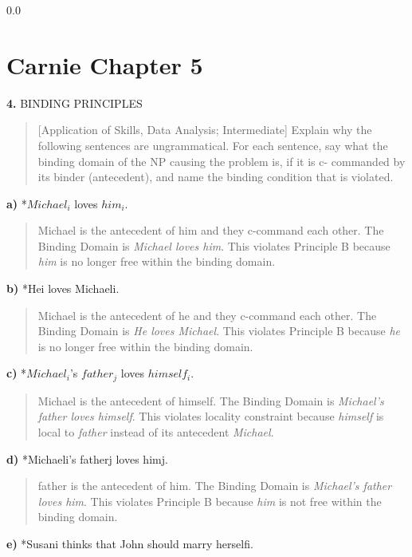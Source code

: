 \documentclass[11pt,notitlepage]{article}
\newcommand{\question}[2]{\textbf{#1.} #2}
\newcommand{\subquestion}[2]{\par\hspace{0.5cm} \textbf{#1)} #2}
\begin{document}
  {\setlength{\baselineskip}%
           {0.0\baselineskip}
  \section*{Carnie Chapter 5}
  \hrulefill \par}

\question{4}{BINDING PRINCIPLES}
\begin{quote}
[Application of Skills, Data Analysis; Intermediate]
Explain why the following sentences are ungrammatical. For each
sentence, say what the binding domain of the NP causing the problem
is, if it is c- commanded by its binder (antecedent), and name the
binding condition that is violated.
\end{quote}

\subquestion{a}{*$Michael_i$ loves $him_i$.}

\begin{quote}
  Michael is the antecedent of him and they c-command each other. The Binding Domain is
  \emph{Michael loves him}. This violates Principle B because
  \emph{him} is no longer free within the binding domain.
\end{quote}

\subquestion{b}{*Hei loves Michaeli.}

\begin{quote}
  Michael is the antecedent of he and they c-command each other. The Binding Domain is
  \emph{He loves Michael}. This violates Principle B because
  \emph{he} is no longer free within the binding domain.
\end{quote}

\subquestion{c}{*$Michael_i$’s $father_j$ loves $himself_i$.}

\begin{quote}
  Michael is the antecedent of himself. The Binding Domain is
  \emph{Michael's father loves himself}. This violates locality
  constraint because \emph{himself} is local to \emph{father} instead
  of its antecedent \emph{Michael}.
\end{quote}

\subquestion{d}{*Michaeli’s fatherj loves himj.}

\begin{quote}
  father is the antecedent of him. The Binding Domain is
  \emph{Michael's father loves him}. This violates Principle B
   because \emph{him} is not free within the binding domain.
\end{quote}

\subquestion{e}{*Susani thinks that John should marry herselfi.}
\end{document}
